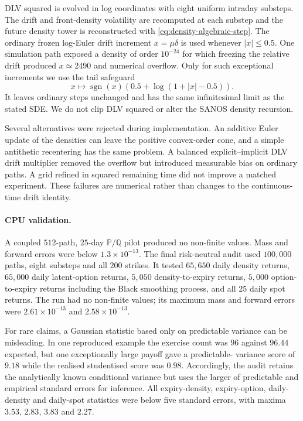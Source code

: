 \documentclass[11pt]{article}
\newcommand{\Q}{\mathbb Q}
\newcommand{\PP}{\mathbb P}
\newcommand{\abs}[1]{\lvert #1\rvert}
\theoremstyle{plain}
\theoremstyle{definition}
\theoremstyle{remark}
\begin{document}
DLV squared is evolved in log coordinates with eight uniform intraday
substeps.  The drift and front-density volatility are recomputed at each
substep and the future density tower is reconstructed with
\eqref{eq:density-algebraic-step}.  The ordinary frozen log-Euler drift
increment $x=\mu\delta$ is used whenever $\abs{x}\leq 0.5$.  One simulation
path exposed a density of order $10^{-24}$ for which freezing the relative
drift produced $x\simeq2490$ and numerical overflow.  Only for such exceptional
increments we use the tail safeguard
\[
  x\longmapsto
  \operatorname{sgn}(x)\left(0.5+\log(1+\abs{x}-0.5)\right).
\]
It leaves ordinary steps unchanged and has the same infinitesimal limit as the
stated SDE.  We do not clip DLV squared or alter the SANOS density recursion.

Several alternatives were rejected during implementation.  An additive Euler
update of the densities can leave the positive convex-order cone, and a simple
antithetic recentering has the same problem.  A balanced explicit--implicit
DLV drift multiplier removed the overflow but introduced measurable bias on
ordinary paths.  A grid refined in squared remaining time did not improve a
matched experiment.  These failures are numerical rather than changes to the
continuous-time drift identity.

\paragraph{CPU validation.}
A coupled $512$-path, $25$-day $\PP/\Q$ pilot produced no non-finite values.
Mass and forward errors were below $1.3\times10^{-13}$.  The final risk-neutral
audit used $100{,}000$ paths, eight substeps and all $200$ strikes.  It tested
$65{,}650$ daily density returns, $65{,}000$ daily latent-option returns,
$5{,}050$ density-to-expiry returns, $5{,}000$ option-to-expiry returns
including the Black smoothing process, and all $25$ daily spot returns.  The
run had no non-finite values; its maximum mass and forward errors were
$2.61\times10^{-13}$ and $2.58\times10^{-13}$.

For rare claims, a Gaussian statistic based only on predictable variance can
be misleading.  In one reproduced example the exercise count was $96$ against
$96.44$ expected, but one exceptionally large payoff gave a predictable-
variance score of $9.18$ while the realised studentised score was $0.98$.
Accordingly, the audit retains the analytically known conditional variance but
uses the larger of predictable and empirical standard errors for inference.
All expiry-density, expiry-option, daily-density and daily-spot statistics were
below five standard errors, with maxima $3.53$, $2.83$, $3.83$ and $2.27$.
\end{document}
